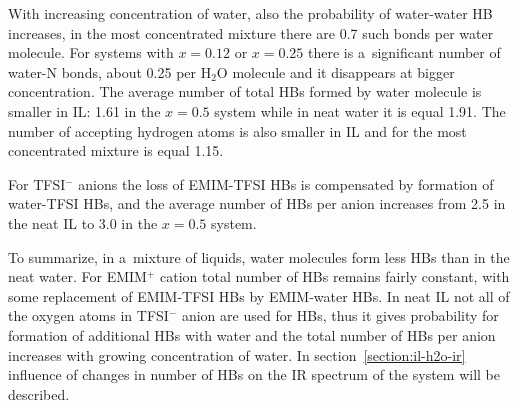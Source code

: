 With increasing concentration of water, also the probability of water-water HB increases, in the most concentrated mixture there are 0.7 such bonds per water molecule. For systems with $x = 0.12$ or $x = 0.25$ there is a~significant number of water-N bonds, about 0.25 per H$_2$O molecule and it disappears at bigger concentration. The average number of total HBs formed by water molecule is smaller in IL: 1.61 in the $x = 0.5$ system while in neat water it is equal 1.91. The number of accepting hydrogen atoms is also smaller in IL and for the most concentrated mixture is equal 1.15. 

For TFSI$^{-}$ anions the loss of EMIM-TFSI HBs is compensated by formation of water-TFSI HBs, and the average number of HBs per anion increases from 2.5 in the neat IL to 3.0 in the $x = 0.5$ system.

To summarize, in a~mixture of liquids, water molecules form less HBs than in the neat water. For EMIM$^{+}$ cation total number of HBs remains fairly constant, with some replacement of EMIM-TFSI HBs by EMIM-water HBs. In neat IL not all of the oxygen atoms in TFSI$^{-}$ anion are used for HBs, thus it gives probability for formation of additional HBs with water and the total number of HBs per anion increases with growing concentration of water. In section~\ref{section:il-h2o-ir} influence of changes in number of HBs on the IR spectrum of the system will be described.